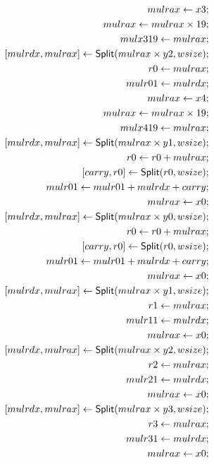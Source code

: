 \allowdisplaybreaks[1]
\begin{align*}
mulrax \leftarrow x3; \\
mulrax \leftarrow mulrax \times 19; \\
mulx319 \leftarrow mulrax; \\
\concat{mulrdx}{mulrax} \leftarrow \dslcode{Split}(mulrax \times y2, wsize); \\
r0 \leftarrow mulrax; \\
mulr01 \leftarrow mulrdx; \\
mulrax \leftarrow x4; \\
mulrax \leftarrow mulrax \times 19; \\
mulx419 \leftarrow mulrax; \\
\concat{mulrdx}{mulrax} \leftarrow \dslcode{Split}(mulrax \times y1, wsize); \\
r0 \leftarrow r0 + mulrax; \\
\concat{carry}{r0} \leftarrow \dslcode{Split}(r0, wsize); \\
mulr01 \leftarrow mulr01 + mulrdx + carry; \\
mulrax \leftarrow x0; \\
\concat{mulrdx}{mulrax} \leftarrow \dslcode{Split}(mulrax \times y0, wsize); \\
r0 \leftarrow r0 + mulrax; \\
\concat{carry}{r0} \leftarrow \dslcode{Split}(r0, wsize); \\
mulr01 \leftarrow mulr01 + mulrdx + carry; \\
mulrax \leftarrow x0; \\
\concat{mulrdx}{mulrax} \leftarrow \dslcode{Split}(mulrax \times y1, wsize); \\
r1 \leftarrow mulrax; \\
mulr11 \leftarrow mulrdx; \\
mulrax \leftarrow x0; \\
\concat{mulrdx}{mulrax} \leftarrow \dslcode{Split}(mulrax \times y2, wsize); \\
r2 \leftarrow mulrax; \\
mulr21 \leftarrow mulrdx; \\
mulrax \leftarrow x0; \\
\concat{mulrdx}{mulrax} \leftarrow \dslcode{Split}(mulrax \times y3, wsize); \\
r3 \leftarrow mulrax; \\
mulr31 \leftarrow mulrdx; \\
mulrax \leftarrow x0; \\

\end{align*}
